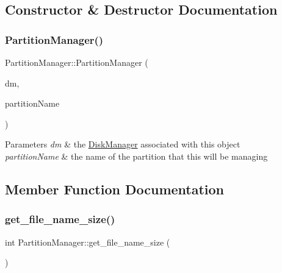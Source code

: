 \subsection{Constructor \& Destructor Documentation}
\mbox{\label{classPartitionManager_aa875b0b19b7ab9f32b02d2c9be383b75}} 
\subsubsection{\texorpdfstring{Partition\+Manager()}{PartitionManager()}}
{\footnotesize\ttfamily Partition\+Manager\+::\+Partition\+Manager (\begin{DoxyParamCaption}\item[{\mbox{\hyperlink{classDiskManager}{Disk\+Manager}} $\ast$}]{dm,  }\item[{string}]{partition\+Name }\end{DoxyParamCaption})}


\begin{DoxyParams}{Parameters}
{\em dm} & the \mbox{\hyperlink{classDiskManager}{Disk\+Manager}} associated with this object \\
\hline
{\em partition\+Name} & the name of the partition that this will be managing \\
\hline
\end{DoxyParams}


\subsection{Member Function Documentation}
\mbox{\label{classPartitionManager_a3b047c1c63c2f9a9e04805471c04ccf0}} 
\subsubsection{\texorpdfstring{get\+\_\+file\+\_\+name\+\_\+size()}{get\_file\_name\_size()}}
{\footnotesize\ttfamily int Partition\+Manager\+::get\+\_\+file\+\_\+name\+\_\+size (\begin{DoxyParamCaption}{ }\end{DoxyParamCaption})}

